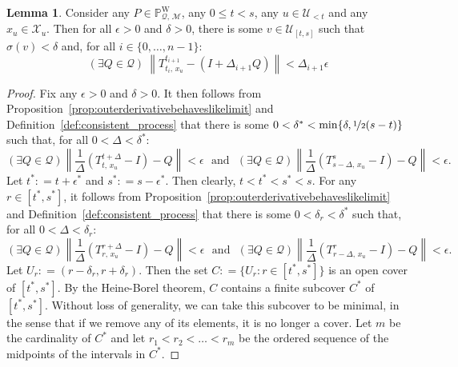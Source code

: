 \documentclass[10pt,a4paper]{paper}
\theoremstyle{definition}
\newtheorem{lemma}[theorem]{Lemma}
\newcommand{\states}{\mathcal{X}}
\newcommand{\processes}{\mathbb{P}}
\newcommand{\wprocesses}{\processes^{\mathrm{W}}}
\newcommand{\rateset}{\mathcal{Q}}
\newcommand{\norm}[1]{\left\lVert #1 \right\rVert}
\newcommand{\coloneqq}{:\!=}
\begin{document}
\begin{lemma}\label{lemma:bound_on_linear_approx_partition}
Consider any $P\in\wprocesses_{\rateset,\,\mathcal{M}}$, any $0\leq t<s$, any $u\in\mathcal{U}_{<t}$ and any $x_u\in\states_u$. Then for all $\epsilon>0$ and $\delta>0$, there is some $v\in\mathcal{U}_{[t,s]}$ such that $\sigma(v)<\delta$ and, for all $i\in\{0,\dots,n-1\}$:
\begin{equation*}
(\exists Q\in\rateset)
~
\norm{
T^{t_{i+1}}_{t_i,\,x_u}-(I+\Delta_{i+1}Q)
}<\Delta_{i+1}\epsilon
\end{equation*}
\end{lemma}
\begin{proof}
Fix any $\epsilon>0$ and $\delta>0$. It then follows from Proposition~\ref{prop:outerderivativebehaveslikelimit} and Definition~\ref{def:consistent_process} that there is some $0<\delta^*<\min\{\delta,\nicefrac{1}{2}(s-t)\}$ such that, for all $0<\Delta<\delta^*$:
\begin{equation}\label{eq:epsilonboundsforboundsinlemma}
(\exists Q\in\rateset)
\norm{\frac{1}{\Delta}
(T^{t+\Delta}_{t,\,x_u}-I)-Q}<\epsilon
\text{~~and~~}
(\exists Q\in\rateset)
\norm{\frac{1}{\Delta}
(T^{s}_{s-\Delta,\,x_u}-I)-Q}<\epsilon.
\end{equation}
Let $t^*\coloneqq t+\epsilon^*$ and $s^*\coloneqq s-\epsilon^*$. Then clearly, $t<t^*<s^*<s$.
For any $r\in[t^*,s^*]$, it follows from Proposition~\ref{prop:outerderivativebehaveslikelimit} and Definition~\ref{def:consistent_process} that there is some $0<\delta_r<\delta^*$ such that, for all $0<\Delta<\delta_r$:
\begin{equation}\label{eq:epsilonboundsforlemma}
(\exists Q\in\rateset)
\norm{\frac{1}{\Delta}
(T^{r+\Delta}_{r,\,x_u}-I)-Q}<\epsilon
\text{~~and~~}
(\exists Q\in\rateset)
\norm{\frac{1}{\Delta}
(T^{r}_{r-\Delta,\,x_u}-I)-Q}<\epsilon.
\end{equation}
Let $U_r\coloneqq(r-\delta_r,r+\delta_r)$. Then the set $C\coloneqq\{U_r\colon r\in[t^*,s^*]\}$ is an open cover of $[t^*,s^*]$. By the Heine-Borel theorem, $C$ contains a finite subcover $C^*$ of $[t^*,s^*]$. Without loss of generality, we can take this subcover to be minimal, in the sense that if we remove any of its elements, it is no longer a cover. Let $m$ be the cardinality of $C^*$ and let $r_1<r_2<\dots<r_m$ be the ordered sequence of the midpoints of the intervals in $C^*$.


\end{proof}
\end{document}
